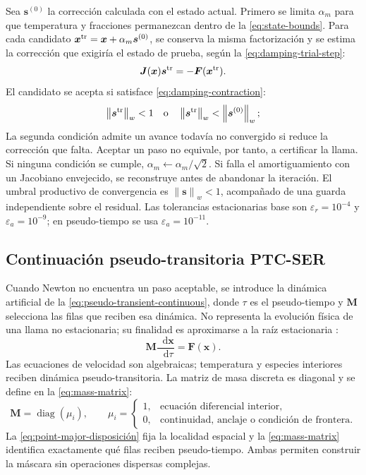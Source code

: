 \documentclass[12pt,a4paper,twoside,openany]{book}
\newcommand{\vect}[1]{\bm{#1}}
\newcommand{\mat}[1]{\bm{#1}}
\newcommand{\dd}{\mathop{}\!\mathrm{d}}
\newcommand{\norm}[1]{\left\lVert #1\right\rVert}
\begin{document}
Sea \(\vect{s}^{(0)}\) la corrección calculada con el estado actual. Primero se
limita \(\alpha_m\) para que temperatura y fracciones permanezcan dentro de la \cref{eq:state-bounds}. Para cada candidato
\(\vect{x}^{\rm tr}=\vect{x}+\alpha_m\vect{s}^{(0)}\), se conserva la misma
factorización y se estima la corrección que exigiría el estado de prueba, según la \cref{eq:damping-trial-step}:
\begin{equation}
  \mat J(\vect{x})\vect{s}^{\rm tr}
  =-\vect F(\vect{x}^{\rm tr}).
  \label{eq:damping-trial-step}
\end{equation}
El candidato se acepta si satisface \cref{eq:damping-contraction}:
\begin{equation}
  \norm{\vect{s}^{\rm tr}}_w<1
  \quad\text{o}\quad
  \norm{\vect{s}^{\rm tr}}_w<\norm{\vect{s}^{(0)}}_w;
  \label{eq:damping-contraction}
\end{equation}
La segunda condición admite un avance todavía no convergido si reduce la
corrección que falta. Aceptar un paso no equivale, por tanto, a certificar la
llama. Si ninguna condición se cumple,
\(\alpha_m\leftarrow\alpha_m/\sqrt{2}\). Si falla el
amortiguamiento con un Jacobiano envejecido, se reconstruye antes de abandonar
la iteración. El umbral productivo de convergencia es
\(\norm{\vect{s}}_w<1\), acompañado de una guarda independiente sobre el
residual. Las tolerancias estacionarias base son
\(\varepsilon_r=10^{-4}\) y \(\varepsilon_a=10^{-9}\); en pseudo-tiempo se usa
\(\varepsilon_a=10^{-11}\).

\subsection{Continuación pseudo-transitoria PTC-SER}
\label{sec:ptc-ser}

Cuando Newton no encuentra un paso aceptable, se introduce la dinámica
artificial de la \cref{eq:pseudo-transient-continuous}, donde \(\tau\) es el
pseudo-tiempo y \(\mat M\) selecciona las filas que reciben esa dinámica.
No representa la evolución física de una llama no estacionaria; su finalidad es aproximarse
a la raíz estacionaria \cite{KelleyKeyes1998}:
\begin{equation}
 \mat M\frac{\dd\vect x}{\dd\tau}=\vect F(\vect x).
 \label{eq:pseudo-transient-continuous}
\end{equation}
Las ecuaciones de velocidad son algebraicas; temperatura y especies interiores
reciben dinámica pseudo-transitoria. La matriz de masa discreta es diagonal y se define en la \cref{eq:mass-matrix}:
\begin{equation}
  \mat{M}=\operatorname{diag}(\mu_i),
  \qquad
  \mu_i=\begin{cases}
  1,&\text{ecuación diferencial interior},\\
  0,&\text{continuidad, anclaje o condición de frontera}.
  \end{cases}
  \label{eq:mass-matrix}
\end{equation}
La \cref{eq:point-major-disposición} fija la localidad espacial y la
\cref{eq:mass-matrix} identifica exactamente qué filas reciben pseudo-tiempo.
Ambas permiten construir la máscara sin operaciones dispersas complejas.
\end{document}
